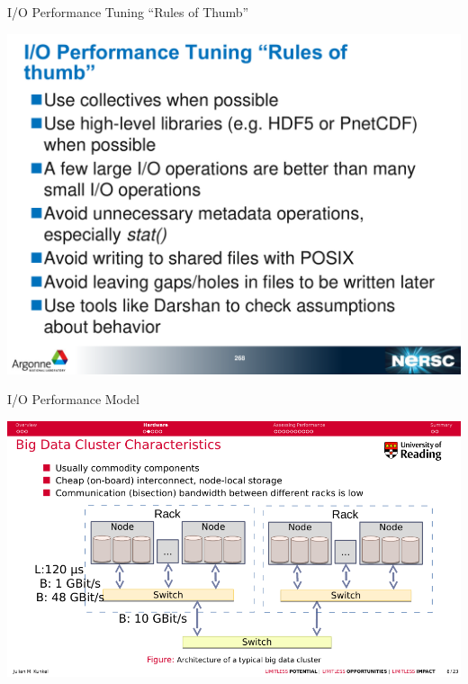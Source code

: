 \documentclass[compress,11pt,xcolor=svgnames,aspectratio=169]{beamer}
\begin{document}
\begin{frame}[t]{I/O Performance Tuning ``Rules of Thumb''}

\begin{center}
\includegraphics[scale=0.35]{fig/io-rules}
\end{center}

\end{frame}

\begin{frame}[t]{I/O Performance Model}

\begin{center}
\includegraphics[scale=0.7]{fig/5-1}
\end{center}

\end{frame}
\end{document}
